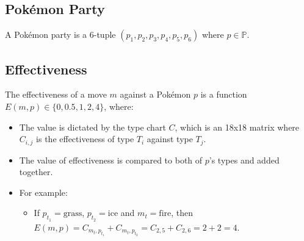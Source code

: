 \subsection{Pokémon Party}

A Pokémon party is a 6-tuple $(p_1, p_2, p_3, p_4, p_5, p_6)$ where $p \in \mathbb{P}$.

\subsection{Effectiveness}

The effectiveness of a move $m$ against a Pokémon $p$ is a function $E(m, p) \in \{0, 0.5, 1, 2, 4\}$, where:
\begin{itemize}
    \item The value is dictated by the type chart $C$, which is an 18x18 matrix where $C_{i, j}$ is the effectiveness of type $T_i$ against type $T_j$.
    \item The value of effectiveness is compared to both of $p$'s types and added together.
    \item For example:
    \begin{itemize}
        \item If $p_{t_1} = \text{grass}$, $p_{t_2} = \text{ice}$ and $m_t = \text{fire}$, then $E(m, p) = C_{m_t, p_{t_1}} + C_{m_t, p_{t_2}} = C_{2, 5} + C_{2, 6} = 2 + 2 = 4$.
    \end{itemize}
\end{itemize}

